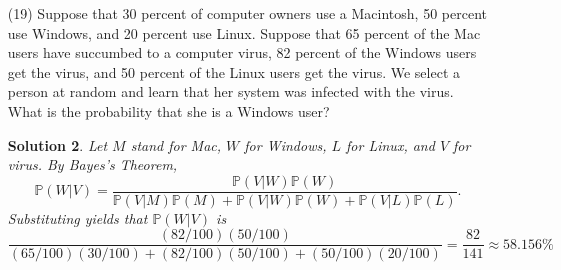 \documentclass[10pt]{article}
\newtheorem*{sol}{Solution}
\renewcommand{\P}{\mathbb{P}}
\begin{document}
\begin{enumerate}
\begin{sol}
\begin{enumerate}[(a)]
\item Order the children from youngest to oldest. Thus the sample space
consists of sequences of length three in $B$ and $N$, $B$ indicating
that a child has blue eyes and $N$ indicating that they do not have blue
eyes:
\[
\Omega = \{NNN, BNN, NBN, NNB, BBN, BNB, NBB, BBB\}.
\]
If at least one child has blue eyes then the element of the sample space
$\Omega$ can be anything except for $NNN$. The probability of this occuring
is \[
3(1/4)(3/4)^2 + 3(1/4)^2(3/4) + (1/4)^3.
\]
Here the first term is the probability of one of the sequences $BNN,NBN,NNB$,
the second term is the probability of one of the sequences $BBN, BNB, NBB$,
and the third term is the probability of $BBB$. So the probability that
at least two children have blue eyes is
\[3(1/4)^2(3/4) + (1/4)^3.\]
The probability that at least two children have blue eyes given that one child
has blue eyes is
\[
\frac{3(1/4)^2(3/4) + (1/4)^3}{3(1/4)(3/4)^2 + 3(1/4)^2(3/4) + (1/4)^3}
=\frac{10}{37}.
\]
\item If the first child has blue eyes then the sequence is
$BNN, BBN, BNB$, or $BBB$. The probability for this event is
$(1/4)(3/4)^2 + 2(1/4)^2(3/4) + (1/4)^3$. The probability that the first child
has blue eyes and at least two children have blue eyes is
$2(1/4)^2(3/4) + (1/4)^3$. So the conditional probability is
\[
\frac{2(1/4)^2(3/4) + (1/4)^3}{(1/4)(3/4)^2 + 2(1/4)^2(3/4) + (1/4)^3}
=\frac{7}{16}.
\]
\end{enumerate}
\end{sol}

\item[(19)]Suppose that 30 percent of computer owners use a Macintosh, 50 percent
use Windows, and 20 percent use Linux. Suppose that 65 percent of the Mac
users have succumbed to a computer virus, 82 percent of the Windows users get
the virus, and 50 percent of the Linux users get the virus. We select a person
at random and learn that her system was infected with the virus. What is the
probability that she is a Windows user?

\begin{sol}
Let $M$ stand for Mac, $W$ for Windows, $L$ for Linux, and $V$ for virus.
By Bayes's Theorem,
\[
\P(W|V) = \frac{\P(V|W)\P(W)}{\P(V|M)\P(M) +\P(V|W)\P(W) + \P(V|L)\P(L)}.
\]
Substituting yields that $\P(W|V)$ is
\[
\frac{(82/100)(50/100)}{(65/100)(30/100)+(82/100)(50/100)+(50/100)(20/100)}
= \frac{82}{141} \approx 58.156 \%
\]
\end{sol}


\end{enumerate}
\end{document}
